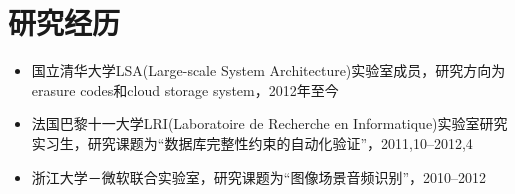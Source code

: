 \documentclass[letterpaper]{article}
\begin{document}

\section*{研究经历}

\begin{itemize}
\item 国立清华大学LSA(Large-scale System Architecture)实验室成员，研究方向为erasure codes和cloud storage system，2012年至今
\item 法国巴黎十一大学LRI(Laboratoire de Recherche en Informatique)实验室研究实习生，研究课题为“数据库完整性约束的自动化验证”，2011,10--2012,4
\item 浙江大学－微软联合实验室，研究课题为“图像场景音频识别”，2010--2012

\end{itemize}
\end{document}
